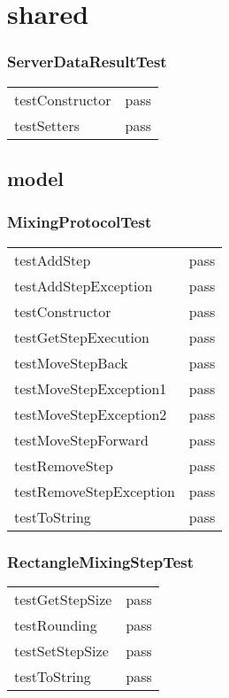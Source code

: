 \section{shared}
\subsubsection*{ServerDataResultTest}
\begin{tabular}{l|l}
testConstructor  & pass \\
testSetters        & pass \\
\end{tabular}

\subsection{model}
\subsubsection*{MixingProtocolTest}
\begin{tabular}{l|l}
testAddStep                       & pass \\
testAddStepException        & pass \\
testConstructor                  & pass \\
testGetStepExecution        & pass \\
testMoveStepBack             & pass \\
testMoveStepException1   & pass \\
testMoveStepException2   & pass \\
testMoveStepForward        & pass \\
testRemoveStep                 & pass \\
testRemoveStepException & pass \\
testToString 			& pass \\
\end{tabular}

\subsubsection*{RectangleMixingStepTest}
\begin{tabular}{l|l}
testGetStepSize  & pass \\
testRounding      & pass \\
testSetStepSize  & pass \\
testToString        & pass \\
\end{tabular}

